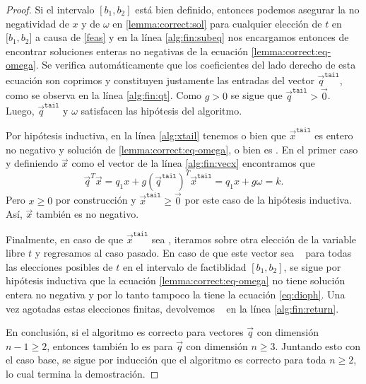 \begin{proof}
	Si el intervalo $[b_1, b_2]$ está bien definido, entonces podemos asegurar la no negatividad de
	$x$ y de $\omega$ en \eqref{lemma:correct:sol} para cualquier elección de $t$ en $[b_1, b_2$] a
	causa de \eqref{feas} y en la línea \ref{alg:fin:subeq} nos encargamos entonces de encontrar
	soluciones enteras no negativas de la ecuación \eqref{lemma:correct:eq-omega}. Se verifica
	automáticamente que los coeficientes del lado derecho de esta ecuación son coprimos y
	constituyen justamente las entradas del vector $\vec{q}^{\texttt{tail}}$, como se observa en la línea
	\ref{alg:fin:qt}. Como $g > 0$ se sigue que $\vec{q}^{\texttt{tail}} > \vec{0}$. Luego,
	$\vec{q}^{\texttt{tail}}$ y $\omega$ satisfacen las hipótesis del algoritmo.

	Por hipótesis inductiva, en la línea \ref{alg:xtail} tenemos o bien que
	$\vec{x}^{\texttt{tail}}$ es entero no negativo y solución de \eqref{lemma:correct:eq-omega}, o
	bien es \NIL. En el primer caso y definiendo $\vec{x}$ como el vector de la línea
	\ref{alg:fin:vecx} encontramos que
	\begin{equation*}
		\vec{q}^T\vec{x} = q_1x + g\left(\vec{q}^{\texttt{tail}}\right)^T\vec{x}^{\texttt{tail}}
		= q_1x + g\omega = k.
	\end{equation*}
	Pero $x \geq 0$ por construcción y $\vec{x}^{\texttt{tail}} \geq \vec{0}$ por este caso de la
	hipótesis inductiva. Así, $\vec{x}$ también es no negativo.

	Finalmente, en caso de que $\vec{x}^{\texttt{tail}}$ sea \NIL, iteramos sobre otra elección de
	la variable libre $t$ y regresamos al caso pasado. En caso de que este vector sea \NIL~ para
	todas las elecciones posibles de $t$ en el intervalo de factiblidad $[b_1, b_2]$, se sigue por
	hipótesis inductiva que la ecuación \eqref{lemma:correct:eq-omega} no tiene solución entera no
	negativa y por lo tanto tampoco la tiene la ecuación \eqref{eq:dioph}. Una vez agotadas estas
	elecciones finitas, devolvemos \NIL~ en la línea \ref{alg:fin:return}.

	En conclusión, si el algoritmo es correcto para vectores $\vec{q}$ con dimensión $n - 1 \geq 2$,
	entonces también lo es para $\vec{q}$ con dimensión $n \geq 3$. Juntando esto con el
	caso base, se sigue por inducción que el algoritmo es correcto para toda $n \geq 2$, lo cual
	termina la demostración.
\end{proof}


